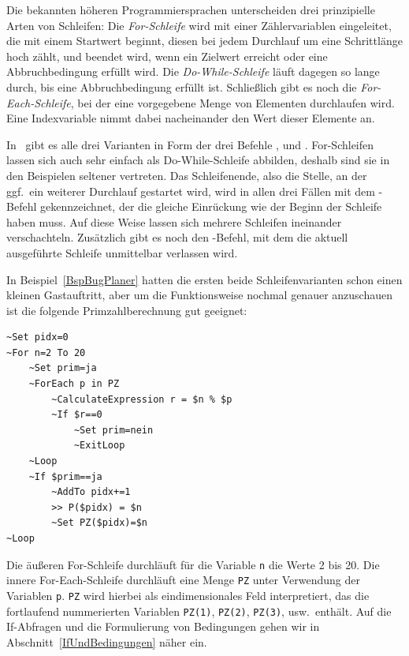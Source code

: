 Die bekannten höheren Programmiersprachen unterscheiden drei prinzipielle Arten von Schleifen: Die \emph{For-Schleife} wird mit einer Zählervariablen eingeleitet, die mit einem Startwert beginnt, diesen bei jedem Durchlauf um eine Schrittlänge hoch zählt, und beendet wird, wenn ein Zielwert erreicht oder eine Abbruchbedingung erfüllt wird. Die \emph{Do-While-Schleife} läuft dagegen so lange durch, bis eine Abbruchbedingung erfüllt ist. Schließlich gibt es noch die \emph{For-Each-Schleife}, bei der eine vorgegebene Menge von Elementen durchlaufen wird. Eine Indexvariable nimmt dabei nacheinander den Wert dieser Elemente an.

In \FPZ\ gibt es alle drei Varianten in Form der drei Befehle ,  und . For-Schleifen lassen sich auch sehr einfach als Do-While-Schleife abbilden, deshalb sind sie in den Beispielen seltener vertreten. Das Schleifenende, also die Stelle, an der ggf.\ ein weiterer Durchlauf gestartet wird, wird in allen drei Fällen mit dem -Befehl gekennzeichnet, der die gleiche Einrückung wie der Beginn der Schleife haben muss. Auf diese Weise lassen sich mehrere Schleifen ineinander verschachteln. Zusätzlich gibt es noch den -Befehl, mit dem die aktuell ausgeführte Schleife unmittelbar verlassen wird.

In Beispiel~\ref{BspBugPlaner} hatten die ersten beide Schleifenvarianten schon einen kleinen Gastauftritt, aber um die Funktionsweise nochmal genauer anzuschauen ist die folgende Primzahlberechnung gut geeignet:

\label{BspPrimzahlen}
\begin{verbatim}
~Set pidx=0
~For n=2 To 20
    ~Set prim=ja
    ~ForEach p in PZ
        ~CalculateExpression r = $n % $p
        ~If $r==0
            ~Set prim=nein
            ~ExitLoop        
    ~Loop
    ~If $prim==ja
        ~AddTo pidx+=1
        >> P($pidx) = $n
        ~Set PZ($pidx)=$n
~Loop
\end{verbatim}

Die äußeren For-Schleife durchläuft für die Variable \verb|n| die Werte 2 bis 20. Die innere For-Each-Schleife durchläuft eine Menge \verb|PZ| unter Verwendung der Variablen \verb|p|. \verb|PZ| wird hierbei als eindimensionales Feld interpretiert, das die fortlaufend nummerierten Variablen \verb|PZ(1)|, \verb|PZ(2)|, \verb|PZ(3)|, usw.\ enthält. Auf die If-Abfragen und die Formulierung von Bedingungen gehen wir in Abschnitt~\ref{IfUndBedingungen} näher ein.

